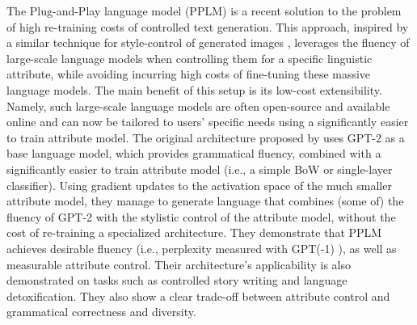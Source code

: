 The Plug-and-Play language model (PPLM) \citep{dathathri2019plug} is a recent solution to the problem of high re-training costs of controlled text generation. This approach, inspired by a similar technique for style-control of generated images \citep{nguyen2017plug}, leverages the fluency of large-scale language models when controlling them for a specific linguistic attribute, while avoiding incurring high costs of fine-tuning these massive language models. The main benefit of this setup is its low-cost extensibility. Namely, such large-scale language models are often open-source and available online and can now be tailored to users' specific needs using a significantly easier to train attribute model. 
The original architecture proposed by \citeauthor{dathathri2019plug} uses GPT-2 as a base language model, which provides grammatical fluency, combined with a significantly easier to train attribute model (i.e., a simple BoW or single-layer classifier). Using gradient updates to the activation space of the much smaller attribute model, they manage to generate language that combines (some of) the fluency of GPT-2 with the stylistic control of the attribute model, without the cost of re-training a specialized architecture. They demonstrate that PPLM achieves desirable fluency (i.e., perplexity measured with GPT(-1) \citep{radford2018improving}), as well as measurable attribute control. Their architecture's applicability is also demonstrated on tasks such as controlled story writing and language detoxification. They also show a clear trade-off between attribute control and grammatical correctness and diversity. 





